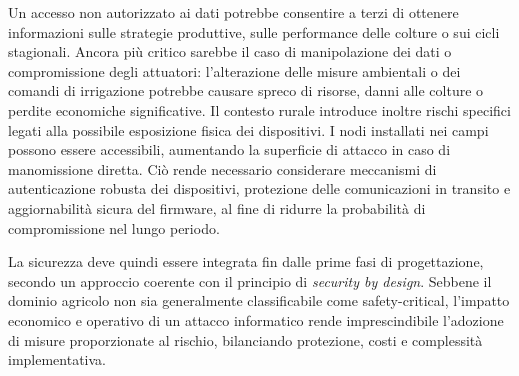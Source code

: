 Un accesso non autorizzato ai dati potrebbe consentire a terzi di ottenere informazioni sulle strategie produttive, sulle performance delle colture o sui cicli stagionali. Ancora più critico sarebbe il caso di manipolazione dei dati o compromissione degli attuatori: l’alterazione delle misure ambientali o dei comandi di irrigazione potrebbe causare spreco di risorse, danni alle colture o perdite economiche significative. Il contesto rurale introduce inoltre rischi specifici legati alla possibile esposizione fisica dei dispositivi. I nodi installati nei campi possono essere accessibili, aumentando la superficie di attacco in caso di manomissione diretta. Ciò rende necessario considerare meccanismi di autenticazione robusta dei dispositivi, protezione delle comunicazioni in transito e aggiornabilità sicura del firmware, al fine di ridurre la probabilità di compromissione nel lungo periodo.

La sicurezza deve quindi essere integrata fin dalle prime fasi di progettazione, secondo un approccio coerente con il principio di \textit{security by design}. Sebbene il dominio agricolo non sia generalmente classificabile come safety-critical, l’impatto economico e operativo di un attacco informatico rende imprescindibile l’adozione di misure proporzionate al rischio, bilanciando protezione, costi e complessità implementativa.
